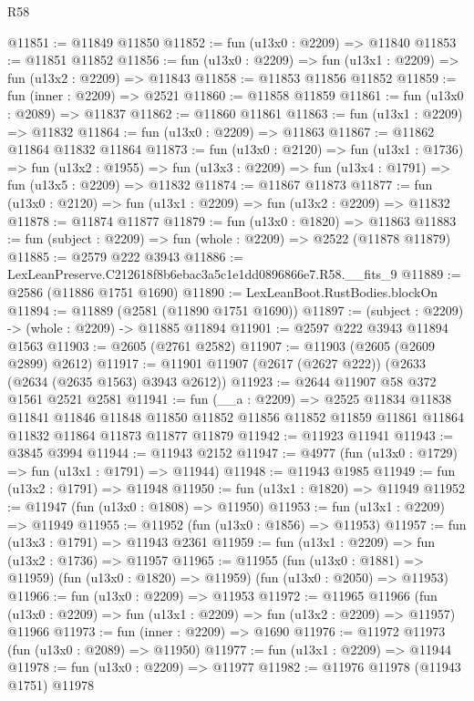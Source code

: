 \begin{lexlean}{R58}
\begin{coremodule}
@11851 := @11849 @11850
@11852 := fun (u13x0 : @2209) => @11840
@11853 := @11851 @11852
@11856 := fun (u13x0 : @2209) => fun (u13x1 : @2209) => fun (u13x2 : @2209) => @11843
@11858 := @11853 @11856 @11852
@11859 := fun (inner : @2209) => @2521
@11860 := @11858 @11859
@11861 := fun (u13x0 : @2089) => @11837
@11862 := @11860 @11861
@11863 := fun (u13x1 : @2209) => @11832
@11864 := fun (u13x0 : @2209) => @11863
@11867 := @11862 @11864 @11832 @11864
@11873 := fun (u13x0 : @2120) =>
  fun (u13x1 : @1736) =>
  fun (u13x2 : @1955) => fun (u13x3 : @2209) => fun (u13x4 : @1791) => fun (u13x5 : @2209) => @11832
@11874 := @11867 @11873
@11877 := fun (u13x0 : @2120) => fun (u13x1 : @2209) => fun (u13x2 : @2209) => @11832
@11878 := @11874 @11877
@11879 := fun (u13x0 : @1820) => @11863
@11883 := fun (subject : @2209) => fun (whole : @2209) => @2522 (@11878 @11879)
@11885 := @2579 @222 @3943
@11886 := LexLeanPreserve.C212618f8b6ebac3a5c1e1dd0896866e7.R58.__fits_9
@11889 := @2586 (@11886 @1751 @1690)
@11890 := LexLeanBoot.RustBodies.blockOn
@11894 := @11889 (@2581 (@11890 @1751 @1690))
@11897 := (subject : @2209) -> (whole : @2209) -> @11885 @11894
@11901 := @2597 @222 @3943 @11894 @1563
@11903 := @2605 (@2761 @2582)
@11907 := @11903 (@2605 (@2609 @2899) @2612)
@11917 := @11901 @11907 (@2617 (@2627 @222)) (@2633 (@2634 (@2635 @1563) @3943 @2612))
@11923 := @2644 @11907 @58 @372 @1561 @2521 @2581
@11941 := fun (__a : @2209) =>
  @2525
    @11834
    @11838
    @11841
    @11846
    @11848
    @11850
    @11852
    @11856
    @11852
    @11859
    @11861
    @11864
    @11832
    @11864
    @11873
    @11877
    @11879
@11942 := @11923 @11941
@11943 := @3845 @3994
@11944 := @11943 @2152
@11947 := @4977 (fun (u13x0 : @1729) => fun (u13x1 : @1791) => @11944)
@11948 := @11943 @1985
@11949 := fun (u13x2 : @1791) => @11948
@11950 := fun (u13x1 : @1820) => @11949
@11952 := @11947 (fun (u13x0 : @1808) => @11950)
@11953 := fun (u13x1 : @2209) => @11949
@11955 := @11952 (fun (u13x0 : @1856) => @11953)
@11957 := fun (u13x3 : @1791) => @11943 @2361
@11959 := fun (u13x1 : @2209) => fun (u13x2 : @1736) => @11957
@11965 := @11955
    (fun (u13x0 : @1881) => @11959)
    (fun (u13x0 : @1820) => @11959)
    (fun (u13x0 : @2050) => @11953)
@11966 := fun (u13x0 : @2209) => @11953
@11972 := @11965
    @11966
    (fun (u13x0 : @2209) => fun (u13x1 : @2209) => fun (u13x2 : @2209) => @11957)
    @11966
@11973 := fun (inner : @2209) => @1690
@11976 := @11972 @11973 (fun (u13x0 : @2089) => @11950)
@11977 := fun (u13x1 : @2209) => @11944
@11978 := fun (u13x0 : @2209) => @11977
@11982 := @11976 @11978 (@11943 @1751) @11978

\end{coremodule}
\end{lexlean}
